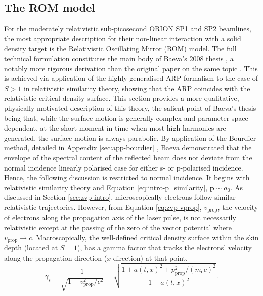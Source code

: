 \subsection{The ROM model}
For the moderately relativistic sub-picosecond ORION SP1 and SP2 beamlines, the most appropriate description for their non-linear interaction with a solid density target is the Relativistic Oscillating Mirror (ROM) model. The full technical formulation constitutes the main body of Baeva's 2008 thesis \cite{baevaHighHarmonicGeneration2008}, a notably more rigorous derivation than the original paper on the same topic \cite{baevaTheoryHighorderHarmonic2006}. This is achieved via application of the highly generalised \ac{ARP} formalism to the case of $S>1$ in relativistic similarity theory, showing that the \ac{ARP} coincides with the relativistic critical density surface. This section provides a more qualitative, physically motivated description of this theory, the salient point of Baeva's thesis being that, while the surface motion is generally complex and parameter space dependent, at the short moment in time when most high harmonics are generated, the surface motion is always parabolic. By application of the Bourdier method, detailed in Appendix \ref{sec:app-bourdier} \cite{bourdierObliqueIncidenceStrong1983}, Baeva demonstrated that the envelope of the spectral content of the reflected beam does not deviate from the normal incidence linearly polarised case for either s- or p-polarised incidence. Hence, the following discussion is restricted to normal incidence. It begins with relativistic similarity theory and Equation \ref{eq:intro-p_similarity}, $\mathbf{p} \sim a_0$. As discussed in Section \ref{sec:zvp-intro}, microscopically electrons follow similar relativistic trajectories. However, from Equation \ref{eq:zvp-vprop}, $v_\mathrm{prop}$, the velocity of electrons along the propagation axis of the laser pulse, is not necessarily relativistic except at the passing of the zero of the vector potential where $v_\mathrm{prop} \to c$. Macroscopically, the well-defined critical density surface within the skin depth (located at $S =1$), has a gamma factor that tracks the electrons' velocity along the propagation direction ($x$-direction) at that point,
\begin{equation}\label{eq:orion-gamma_s}
	\gamma_\mathrm{s} = \frac{1}{\sqrt{1-v_\mathrm{prop}^2/c^2}} = \sqrt{ \frac{1 + a(t,x)^2 +  p_\mathrm{prop}^2/(m_\mathrm{e}c)^2}{1 + a(t,x)^2}}.
\end{equation}
